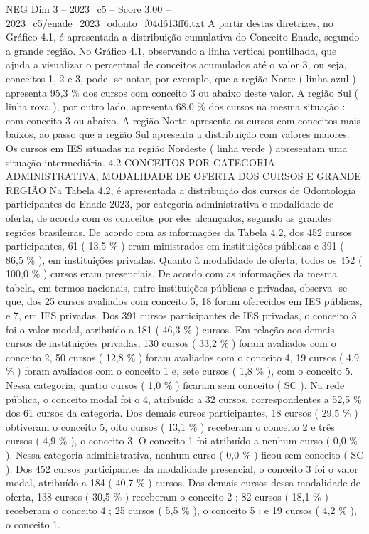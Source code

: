 \begin{textsample}{NEG Dim 3 – 2023\_c5 – Score 3.00 – 2023\_c5/enade\_2023\_odonto\_f04d613ff6.txt}
A partir destas diretrizes, no Gráfico 4.1, é apresentada a distribuição cumulativa do Conceito Enade, segundo a grande região.
No Gráfico 4.1, observando a linha vertical pontilhada, que ajuda a visualizar o percentual de conceitos acumulados até o valor 3, ou seja, conceitos 1, 2 e 3, pode -se notar, por exemplo, que a região Norte ( linha azul ) apresenta 95,3 \% dos cursos com conceito 3 ou abaixo deste valor.
A região Sul ( linha roxa ), por outro lado, apresenta 68,0 \% dos cursos na mesma situação : com conceito 3 ou abaixo.
A região Norte apresenta os cursos com conceitos mais baixos, ao passo que a região Sul apresenta a distribuição com valores maiores.
Os cursos em IES situadas na região Nordeste ( linha verde ) apresentam uma situação intermediária. 4.2 CONCEITOS POR CATEGORIA ADMINISTRATIVA, MODALIDADE DE OFERTA DOS CURSOS E GRANDE REGIÃO Na Tabela 4.2, é apresentada a distribuição dos cursos de Odontologia participantes do Enade 2023, por categoria administrativa e modalidade de oferta, de acordo com os conceitos por eles alcançados, segundo as grandes regiões brasileiras.
De acordo com as informações da Tabela 4.2, dos 452 cursos participantes, 61 ( 13,5 \% ) eram ministrados em instituições públicas e 391 ( 86,5 \% ), em instituições privadas.
Quanto à modalidade de oferta, todos os 452 ( 100,0 \% ) cursos eram presenciais.
De acordo com as informações da mesma tabela, em termos nacionais, entre instituições públicas e privadas, observa -se que, dos 25 cursos avaliados com conceito 5, 18 foram oferecidos em IES públicas, e 7, em IES privadas.
Dos 391 cursos participantes de IES privadas, o conceito 3 foi o valor modal, atribuído a 181 ( 46,3 \% ) cursos.
Em relação aos demais cursos de instituições privadas, 130 cursos ( 33,2 \% ) foram avaliados com o conceito 2, 50 cursos ( 12,8 \% ) foram avaliados com o conceito 4, 19 cursos ( 4,9 \% ) foram avaliados com o conceito 1 e, sete cursos ( 1,8 \% ), com o conceito 5.
Nessa categoria, quatro cursos ( 1,0 \% ) ficaram sem conceito ( SC ).
Na rede pública, o conceito modal foi o 4, atribuído a 32 cursos, correspondentes a 52,5 \% dos 61 cursos da categoria.
Dos demais cursos participantes, 18 cursos ( 29,5 \% ) obtiveram o conceito 5, oito cursos ( 13,1 \% ) receberam o conceito 2 e três cursos ( 4,9 \% ), o conceito 3.
O conceito 1 foi atribuído a nenhum curso ( 0,0 \% ).
Nessa categoria administrativa, nenhum curso ( 0,0 \% ) ficou sem conceito ( SC ).
Dos 452 cursos participantes da modalidade presencial, o conceito 3 foi o valor modal, atribuído a 184 ( 40,7 \% ) cursos.
Dos demais cursos dessa modalidade de oferta, 138 cursos ( 30,5 \% ) receberam o conceito 2 ; 82 cursos ( 18,1 \% ) receberam o conceito 4 ; 25 cursos ( 5,5 \% ), o conceito 5 ; e 19 cursos ( 4,2 \% ), o conceito 1.

\end{textsample}
